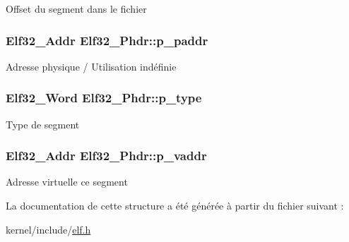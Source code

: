 Offset du segment dans le fichier \hypertarget{structElf32__Phdr_af18f0a179a5fca09e3c04bcdce3fac2f}{
\subsubsection[{p\-\_\-paddr}]{\setlength{\rightskip}{0pt plus 5cm}Elf32\-\_\-\-Addr Elf32\-\_\-\-Phdr\-::p\-\_\-paddr}}\label{structElf32__Phdr_af18f0a179a5fca09e3c04bcdce3fac2f}
Adresse physique / Utilisation indéfinie \hypertarget{structElf32__Phdr_a8b1d2942ddb9abcb85db1429b5116923}{
\subsubsection[{p\-\_\-type}]{\setlength{\rightskip}{0pt plus 5cm}Elf32\-\_\-\-Word Elf32\-\_\-\-Phdr\-::p\-\_\-type}}\label{structElf32__Phdr_a8b1d2942ddb9abcb85db1429b5116923}
Type de segment \hypertarget{structElf32__Phdr_a01a298ebc899bcf9c23211a7bf1155a6}{
\subsubsection[{p\-\_\-vaddr}]{\setlength{\rightskip}{0pt plus 5cm}Elf32\-\_\-\-Addr Elf32\-\_\-\-Phdr\-::p\-\_\-vaddr}}\label{structElf32__Phdr_a01a298ebc899bcf9c23211a7bf1155a6}
Adresse virtuelle ce segment 

La documentation de cette structure a été générée à partir du fichier suivant \-:\begin{DoxyCompactItemize}
\item 
kernel/include/\hyperlink{elf_8h}{elf.\-h}\end{DoxyCompactItemize}
